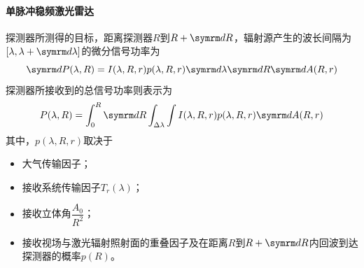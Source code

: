 \paragraph{单脉冲稳频激光雷达}探测器所测得的目标，距离探测器$ R $到$ R+\diff R $，辐射源产生的波长间隔为$ [\lambda,\lambda + \diff \lambda] $的微分信号功率为
\begin{equation}
\diff P(\lambda,R) = I(\lambda,R,r)p(\lambda,R,r)\diff\lambda \diff R \diff A(R,r) 
\end{equation}
探测器所接收到的总信号功率则表示为
\begin{equation}
P(\lambda,R) = \int_{0}^{R}\diff R\int_{\Delta\lambda}\int I(\lambda,R,r)p(\lambda,R,r)\diff A(R,r)
\end{equation}
其中，$ p(\lambda,R,r) $取决于
\begin{itemize}
	\item 大气传输因子；
	\item 接收系统传输因子$ T_r(\lambda) $；
	\item 接收立体角$ \dfrac{A_0}{R^2} $；
	\item 接收视场与激光辐射照射面的重叠因子及在距离$ R $到$ R+\diff R $内回波到达探测器的概率$ p(R) $。
\end{itemize} %
